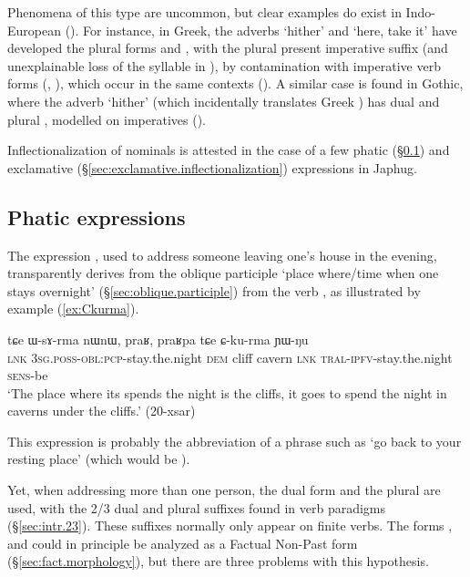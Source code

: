 Phenomena of this type are uncommon, but clear examples do exist in Indo-European (\citealt[414]{pott1859}). For instance, in Greek, the adverbs  `hither' and  `here, take it' have developed the plural forms  and , with the plural present imperative suffix  (and unexplainable loss of the syllable  in ), by contamination with imperative verb forms (, ), which occur in the same contexts (\citealt[113--114]{viti15wandel}).  A similar case is found in Gothic, where the adverb  `hither' (which incidentally translates Greek ) has dual  and plural , modelled on imperatives (\citealt[104]{braune53gotische}).

Inflectionalization of nominals is attested in the case of a few phatic  (§\ref{sec:phatic.inflectionalization}) and exclamative (§\ref{sec:exclamative.inflectionalization}) expressions in Japhug.

\subsection{Phatic expressions} \label{sec:phatic.inflectionalization}
The  expression , used to address someone leaving one's house in the evening, transparently derives from the oblique participle  `place where/time when one stays overnight' (§\ref{sec:oblique.participle}) from the verb , as illustrated by example (\ref{ex:Ckurma}).  

\begin{exe}
\ex \label{ex:Ckurma}
\gll tɕe ɯ-sɤ-rma nɯnɯ, praʁ, praʁpa tɕe ɕ-ku-rma ɲɯ-ŋu \\
\textsc{lnk} \textsc{3sg}.\textsc{poss}-\textsc{obl}:\textsc{pcp}-stay.the.night \textsc{dem} cliff cavern \textsc{lnk} \textsc{tral}-\textsc{ipfv}-stay.the.night \textsc{sens}-be \\
\glt `The place where its spends the night is the cliffs, it goes to spend the night in caverns under the cliffs.' (20-xsar)
\end{exe}

This expression is probably the abbreviation of a phrase such as `go back to your resting place' (which would be ).

Yet, when addressing more than one person, the dual form   and the plural   are used, with the 2/3 dual  and plural  suffixes found in verb paradigms (§\ref{sec:intr.23}). These suffixes normally only appear on finite verbs. The forms ,  and  could in principle be analyzed as a Factual Non-Past form (§\ref{sec:fact.morphology}), but there are three problems with this hypothesis. 

